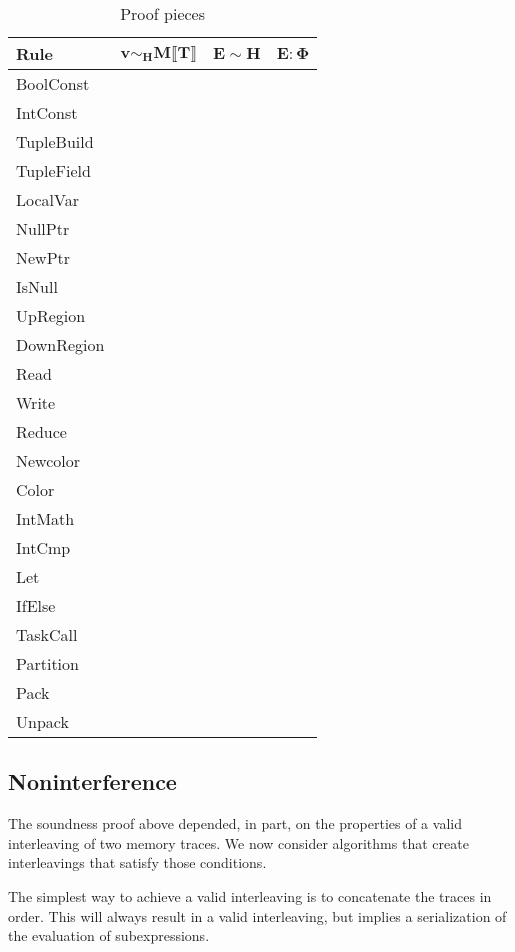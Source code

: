 \begin{table*}
\centering
{\small
\begin{tabular}{l|p{5cm}|p{5cm}|p{5cm}}
{\bf Rule} & 
\multicolumn{1}{|c|}{$\mathbf{v \sim_H M \llbracket T \rrbracket}$} &
\multicolumn{1}{|c|}{$\mathbf{E \sim H}$} &
\multicolumn{1}{|c|}{$\mathbf{E : \Phi}$} \\
\hline
BoolConst & & & \\
IntConst & & & \\
TupleBuild & & & \\
TupleField & & & \\
LocalVar & & & \\
NullPtr & & & \\
NewPtr & & & \\
IsNull & & & \\
UpRegion & & & \\
DownRegion & & & \\
Read & & & \\
Write & & & \\
Reduce & & & \\
Newcolor & & & \\
Color & & & \\
IntMath & & & \\
IntCmp & & & \\
Let & & & \\
IfElse & & & \\
TaskCall & & & \\
Partition & & & \\
Pack & & & \\
Unpack & & &
\end{tabular}}
\caption{Proof pieces}
\end{table*}


\subsection{Noninterference}

The soundness proof above depended, in part, on the properties of a valid interleaving of two
memory traces.  We now consider algorithms that create interleavings that satisfy those
conditions.

The simplest way to achieve a valid interleaving is to concatenate the traces in order.  This
will always result in a valid interleaving, but implies a serialization of the evaluation of
subexpressions.


